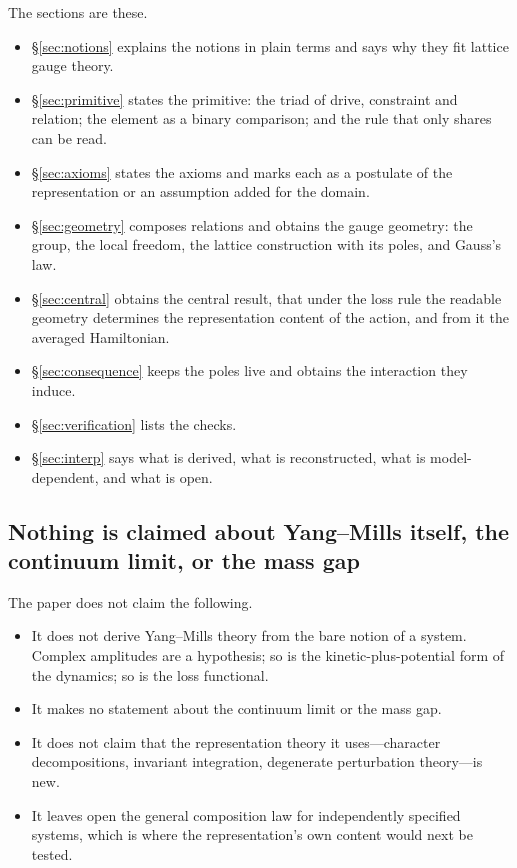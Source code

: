 \documentclass[11pt,a4paper]{article}
\theoremstyle{plain}
\theoremstyle{definition}
\theoremstyle{remark}
\begin{document}
The sections are these.
\begin{itemize}[leftmargin=2em, itemsep=1pt]
\item \S\ref{sec:notions} explains the notions in plain terms and says why they fit lattice gauge theory.
\item \S\ref{sec:primitive} states the primitive: the triad of drive, constraint and relation; the element as a binary comparison; and the rule that only shares can be read.
\item \S\ref{sec:axioms} states the axioms and marks each as a postulate of the representation or an assumption added for the domain.
\item \S\ref{sec:geometry} composes relations and obtains the gauge geometry: the group, the local freedom, the lattice construction with its poles, and Gauss's law.
\item \S\ref{sec:central} obtains the central result, that under the loss rule the readable geometry determines the representation content of the action, and from it the averaged Hamiltonian.
\item \S\ref{sec:consequence} keeps the poles live and obtains the interaction they induce.
\item \S\ref{sec:verification} lists the checks.
\item \S\ref{sec:interp} says what is derived, what is reconstructed, what is model-dependent, and what is open.
\end{itemize}

\subsection{Nothing is claimed about Yang--Mills itself, the continuum limit, or the mass gap}

The paper does not claim the following.
\begin{itemize}[leftmargin=2em, itemsep=1pt]
\item It does not derive Yang--Mills theory from the bare notion of a system. Complex amplitudes are a hypothesis; so is the kinetic-plus-potential form of the dynamics; so is the loss functional.
\item It makes no statement about the continuum limit or the mass gap.
\item It does not claim that the representation theory it uses---character decompositions, invariant integration, degenerate perturbation theory---is new.
\item It leaves open the general composition law for independently specified systems, which is where the representation's own content would next be tested.
\end{itemize}
\end{document}
